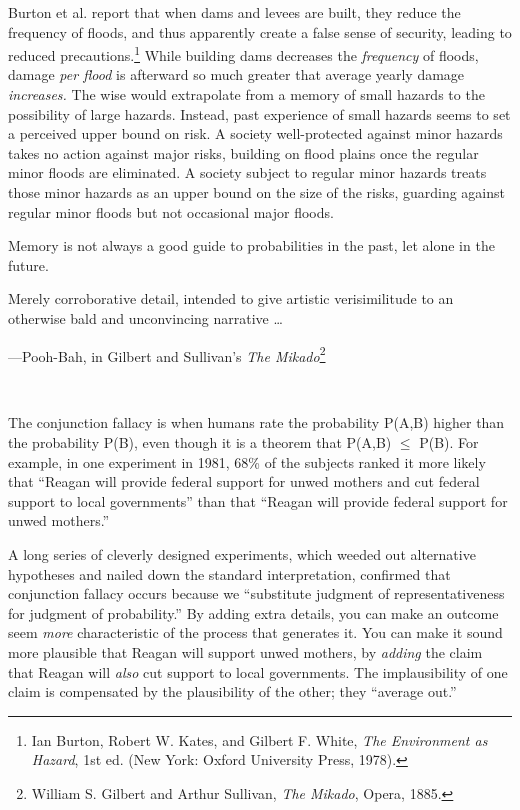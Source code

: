 {
 Burton et al. report that when dams and levees are built, they
reduce the frequency of floods, and thus apparently create a false
sense of security, leading to reduced precautions.\footnote{Ian Burton, Robert W. Kates, and Gilbert F. White, \textit{The
Environment as Hazard}, 1st ed. (New York: Oxford University Press,
1978).}
While building dams decreases the \textit{frequency} of floods, damage
\textit{per flood} is afterward so much greater that average yearly
damage \textit{increases.} The wise would extrapolate from a memory of
small hazards to the possibility of large hazards. Instead, past
experience of small hazards seems to set a perceived upper bound on
risk. A society well-protected against minor hazards takes no action
against major risks, building on flood plains once the regular minor
floods are eliminated. A society subject to regular minor hazards
treats those minor hazards as an upper bound on the size of the risks,
guarding against regular minor floods but not occasional major floods.}

{
 Memory is not always a good guide to probabilities in the past,
let alone in the future.}

\myendsectiontext


\bigskip


{
 Merely corroborative detail, intended to give artistic
verisimilitude to an otherwise bald and unconvincing narrative \ldots}

{\raggedleft
 {}---Pooh-Bah, in Gilbert and Sullivan's
\textit{The Mikado}\footnote{William S. Gilbert and Arthur Sullivan, \textit{The Mikado},
Opera, 1885.}
\par}


\bigskip

{
 ~}

{
 The conjunction fallacy is when humans rate the probability P(A,B)
higher than the probability P(B), even though it is a theorem that
P(A,B) ${\leq}$ P(B). For example, in one experiment in 1981, 68\% of
the subjects ranked it more likely that ``Reagan will
provide federal support for unwed mothers and cut federal support to
local governments'' than that
``Reagan will provide federal support for unwed
mothers.''}

{
 A long series of cleverly designed experiments, which weeded out
alternative hypotheses and nailed down the standard interpretation,
confirmed that conjunction fallacy occurs because we
``substitute judgment of representativeness for
judgment of probability.'' By adding extra details,
you can make an outcome seem \textit{more} characteristic of the
process that generates it. You can make it sound more plausible that
Reagan will support unwed mothers, by \textit{adding} the claim that
Reagan will \textit{also} cut support to local governments. The
implausibility of one claim is compensated by the plausibility of the
other; they ``average out.''}

